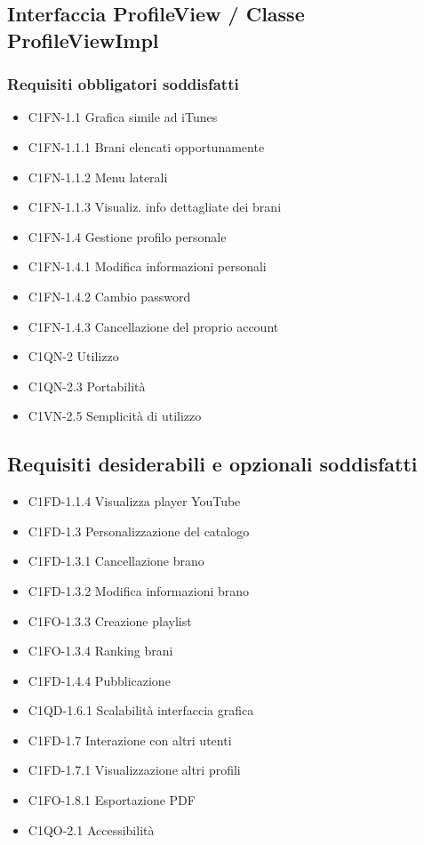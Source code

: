 \subsection{Interfaccia ProfileView / Classe ProfileViewImpl}
\subsubsection*{Requisiti obbligatori soddisfatti}
\begin{itemize}
    \item C1FN-1.1 Grafica simile ad iTunes
	\item C1FN-1.1.1 Brani elencati opportunamente
	\item C1FN-1.1.2 Menu laterali
	\item C1FN-1.1.3 Visualiz. info dettagliate dei brani
    \item C1FN-1.4 Gestione profilo personale
    \item C1FN-1.4.1 Modifica informazioni personali
    \item C1FN-1.4.2 Cambio password
    \item C1FN-1.4.3 Cancellazione del proprio account
    \item C1QN-2 Utilizzo
    \item C1QN-2.3 Portabilit\`a
    \item C1VN-2.5 Semplicit\`a di utilizzo
\end{itemize}
\subsection*{Requisiti desiderabili e opzionali soddisfatti}
\begin{itemize}
    \item C1FD-1.1.4 Visualizza player YouTube
    \item C1FD-1.3 Personalizzazione del catalogo 
    \item C1FD-1.3.1 Cancellazione brano
    \item C1FD-1.3.2 Modifica informazioni brano
    \item C1FO-1.3.3 Creazione playlist  
    \item C1FO-1.3.4 Ranking brani  
    \item C1FD-1.4.4 Pubblicazione
    \item C1QD-1.6.1 Scalabilit\`a interfaccia grafica
    \item C1FD-1.7 Interazione con altri utenti
    \item C1FD-1.7.1 Visualizzazione altri profili
    \item C1FO-1.8.1 Esportazione PDF
    \item C1QO-2.1 Accessibilit\`a
\end{itemize}
